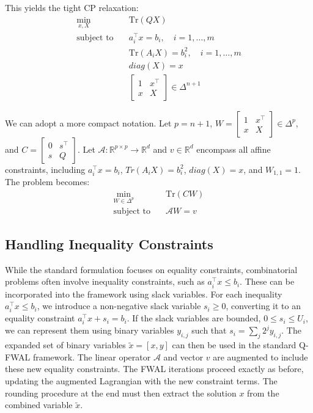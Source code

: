 \documentclass{article}
\begin{document}
This yields the tight CP relaxation:
\begin{align}
\min_{x, X} \quad & \text{Tr}(QX) \nonumber \\
\text{subject to} \quad & a_i^\top x = b_i, \quad i = 1, \dots, m \nonumber \\
& \text{Tr}(A_i X) = b_i^2, \quad i = 1, \dots, m \nonumber \\
& diag(X) = x \nonumber \\
& \begin{bmatrix} 1 & x^\top \\ x & X \end{bmatrix} \in \Delta^{n+1} \label{eq:cp_full}
\end{align}

We can adopt a more compact notation. Let $p = n + 1$, $W = \begin{bmatrix} 1 & x^\top \\ x & X \end{bmatrix} \in \Delta^p$, and $C = \begin{bmatrix} 0 & s^\top \\ s & Q \end{bmatrix}$. Let $\mathcal{A} : \mathbb{R}^{p \times p} \rightarrow \mathbb{R}^d$ and $v \in \mathbb{R}^d$ encompass all affine constraints, including $a_i^\top x = b_i$, $Tr(A_i X) = b_i^2$, $diag(X) = x$, and $W_{1,1} = 1$. The problem becomes:
\begin{align}
\min_{W \in \Delta^p} \quad & \text{Tr}(CW) \nonumber \\
\text{subject to} \quad & \mathcal{A}W = v \label{eq:cp_compact}
\end{align}

\subsection{Handling Inequality Constraints}

While the standard formulation focuses on equality constraints, combinatorial problems often involve inequality constraints, such as $a_i^\top x \le b_i$. These can be incorporated into the framework using slack variables. 
For each inequality $a_i^\top x \le b_i$, we introduce a non-negative slack variable $s_i \ge 0$, converting it to an equality constraint $a_i^\top x + s_i = b_i$.
If the slack variables are bounded, $0 \le s_i \le U_i$, we can represent them using binary variables $y_{i,j}$ such that $s_i = \sum_j 2^j y_{i,j}$. The expanded set of binary variables $\tilde{x} = [x, y]$ can then be used in the standard Q-FWAL framework.
The linear operator $\mathcal{A}$ and vector $v$ are augmented to include these new equality constraints. The FWAL iterations proceed exactly as before, updating the augmented Lagrangian with the new constraint terms. The rounding procedure at the end must then extract the solution $x$ from the combined variable $\tilde{x}$.
\end{document}
